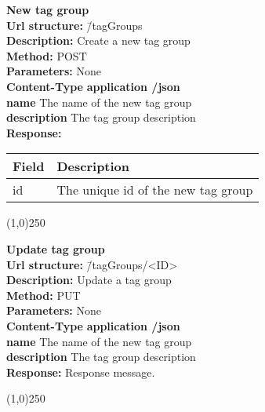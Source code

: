 \documentclass[11pt]{article}
\begin{document}
\begin{tabbing}
\textbf{New tag group} \\
\textcolor{black!60}{\textbf{Url structure:}} \hspace{0.2in} \= /tagGroups \\
\textcolor{black!60}{\textbf{Description:}}  \> Create a new tag group \\
\textcolor{black!60}{\textbf{Method:}} \> POST \\
\textcolor{black!60}{\textbf{Parameters:}} \> None \\
\textcolor{black!60}{\textbf{Content-Type}} \> \textbf{application /json} \\
\> \textbf{name} The name of the new tag group \\
\> \textbf{description} The tag group description \\
\textcolor{black!60}{\textbf{Response:}} \\ \>
\begin{tabular}{|l|l|}
\hline
 Field  &  Description                         \\
\hline
 id     &  The unique id of the new tag group  \\
\hline
\end{tabular}
\end{tabbing}

\begin{center}\line(1,0){250}\end{center}

\begin{tabbing}
\textbf{Update tag group} \\
\textcolor{black!60}{\textbf{Url structure:}} \hspace{0.2in} \= /tagGroups/<ID> \\
\textcolor{black!60}{\textbf{Description:}} \> Update a tag group \\
\textcolor{black!60}{\textbf{Method:}} \> PUT \\
\textcolor{black!60}{\textbf{Parameters:}} \> None \\
\textcolor{black!60}{\textbf{Content-Type}} \> \textbf{application /json} \\
\> \textbf{name} The name of the new tag group \\
\> \textbf{description} The tag group description \\
\textcolor{black!60}{\textbf{Response:}} \> Response message.
\end{tabbing}

\begin{center}\line(1,0){250}\end{center}
\end{document}
